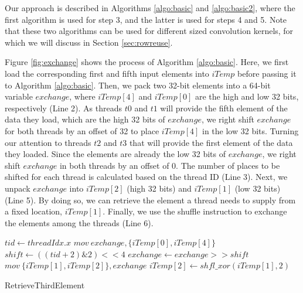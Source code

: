 Our approach is described in Algorithms \ref{algo:basic} and \ref{algo:basic2}, where the first algorithm is used for step 3, and the latter is used for steps 4 and 5. 
Note that these two algorithms can be used for different sized convolution kernels, for which we will discuss in Section \ref {sec:rowreuse}.

Figure \ref{fig:exchange} shows the process of Algorithm \ref{algo:basic}. 
Here, we first load the corresponding first and fifth input elements into $iTemp$ before passing it to Algorithm \ref{algo:basic}. 
Then, we pack two 32-bit elements into a 64-bit variable $exchange$, where $iTemp[4]$ and $iTemp[0]$ are the high and low 32 bits, respectively (Line 2).  
As threads $t0$ and $t1$ will provide the fifth element of the data they load, which are the high 32 bits of $exchange$, we right shift $exchange$ for both threads by an offset of 32 to place $iTemp[4]$ in the low 32 bits. 
Turning our attention to threads $t2$ and $t3$ that will provide the first element of the data they loaded.
Since the elements are already the low 32 bits of $exchange$, we right shift $exchange$ in both threads by an offset of 0. 
The number of places to be shifted for each thread is calculated based on the thread ID (Line 3). 
Next, we unpack $exchange$ into $iTemp[2]$ (high 32 bits) and $iTemp[1]$ (low 32 bits) (Line 5). By doing so, we can retrieve the element a thread needs to supply from a fixed location, $iTemp[1]$. 
Finally, we use the shuffle instruction to exchange the elements among the threads (Line 6).

\begin{algorithm}[t!]
\small

	$tid \gets threadIdx.x$\;
	$mov\ exchange, \{iTemp[0], iTemp[4]\}$\;
	$shift \gets ((tid+2)\&2)<<4$\;
	$exchange \gets exchange >> shift$\;
	$mov\ \{iTemp[1],iTemp[2]\}, exchange$\;
	$iTemp[2] \gets shfl\_xor(iTemp[1],2)$\;	
	
	\caption{RetrieveThirdElement}
	\label{algo:basic}
	
\end{algorithm}

